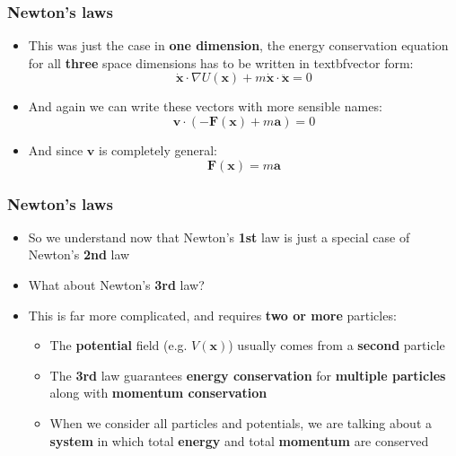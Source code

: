 \documentclass{beamer}
\begin{document}
\begin{frame}
  \frametitle{Newton's laws}
  \begin{itemize}
    \item<1-> This was just the case in \textbf{one dimension}, the energy conservation equation for all \textbf{three} space dimensions has to be written in textbf{vector form}:
      \begin{equation*}
	\dot{\mathbf{x}}\cdot\nabla U(\mathbf{x})+m\dot{\mathbf{x}}\cdot\ddot{\mathbf{x}}=0
      \end{equation*}
    \item<2-> And again we can write these vectors with more sensible names:
      \begin{equation*}
	\mathbf{v}\cdot\left( -\mathbf{F}(\mathbf{x})+m\mathbf{a} \right)=0
      \end{equation*}
    \item<3-> And since $\mathbf{v}$ is completely general:
      \begin{equation*}
	\mathbf{F}(\mathbf{x})=m\mathbf{a}
      \end{equation*}
  \end{itemize}
\end{frame}

\begin{frame}
  \frametitle{Newton's laws}
  \begin{itemize}
    \item<1-> So we understand now that Newton's \textbf{1st} law is just a special case of Newton's \textbf{2nd} law
    \item<2-> What about Newton's \textbf{3rd} law?
    \item<3-> This is far more complicated, and requires \textbf{two or more} particles:
      \begin{itemize}
	\item<4-> The \textbf{potential} field (e.g. $V(\mathbf{x})$) usually comes from a \textbf{second} particle
	\item<5-> The \textbf{3rd} law guarantees \textbf{energy conservation} for \textbf{multiple particles} along with \textbf{momentum conservation}
	\item<6-> When we consider all particles and potentials, we are talking about a \textbf{system} in which total \textbf{energy} and total \textbf{momentum} are conserved
      \end{itemize}
  \end{itemize}
\end{frame}
\end{document}
